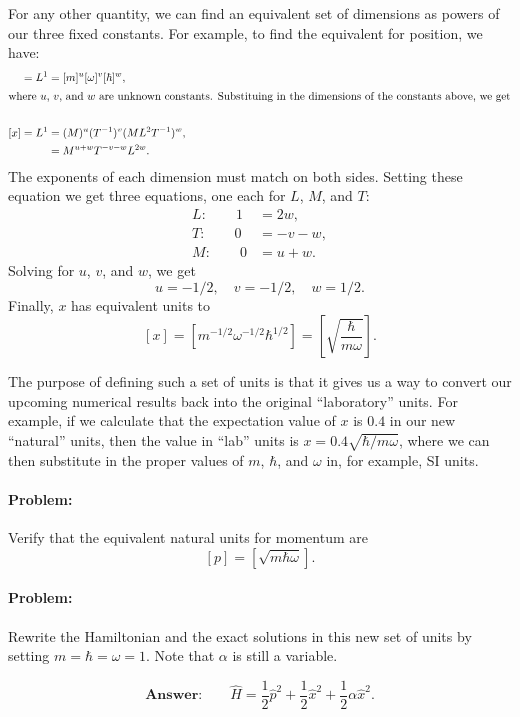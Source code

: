 \documentclass[fontsize=11pt,paper=letter,twoside=false,onecolumn]{article} %
\begin{document}
For any other quantity, we can find an equivalent set of dimensions as powers of our three fixed constants.  For example, to find the equivalent for position, we have:
\begin{align*}
    [x] = L^1 &= [m]^u [\omega]^v [\hbar]^w,\\
    \intertext{where $u$, $v$, and $w$ are unknown constants.  Substituing in the dimensions of the constants above, we get}\\
    [x] = L^1 &= (M)^u (T^{-1})^v (ML^2 T^{-1})^w,\\
    &= M^{u+w}T^{-v-w}L^{2w}.
\end{align*}
The exponents of each dimension must match on both sides.
Setting these equation we get three equations, one each for $L$, $M$, and $T$:
\begin{align*}
 L:\qquad 1 & = 2w, \\
 T:\qquad 0 & = -v -w, \\
 M:\qquad 0 & = u+w.
\end{align*}
Solving for $u$, $v$, and $w$, we get
\[
u=-1/2, \quad v=-1/2 , \quad w=1/2.
\]
Finally, $x$ has equivalent units to
\[
[x] = [m^{-1/2} \omega^{-1/2} \hbar^{1/2}] = \left[\sqrt{\frac{\hbar}{m\omega}}\right].   
\]

The purpose of defining such a set of units is that it gives us a way to convert our upcoming numerical results back into the original ``laboratory'' units.
For example, if we calculate that the expectation value of $x$ is $0.4$ in our new ``natural'' units, then the value in ``lab'' units is $x=0.4 \sqrt{\hbar/m\omega}$, where we can then substitute in the proper values of $m$, $\hbar$, and $\omega$ in, for example, SI units.

\paragraph*{Problem: }Verify that the equivalent natural units for momentum are
\[
[p] = \left[\sqrt{m\hbar \omega}\right].    
\]

\paragraph*{Problem: }Rewrite the Hamiltonian and the exact solutions in this new set of units by setting $m=\hbar=\omega=1$.  Note that $\alpha$ is still a variable.

\begin{equation}\label{eq:fullH}
\textbf{Answer:}\qquad\hat{H} = \frac12 \hat{p}^2 + \frac12 \hat{x}^2 + \frac12 \alpha\hat{x}^2.
\end{equation}
\end{document}
